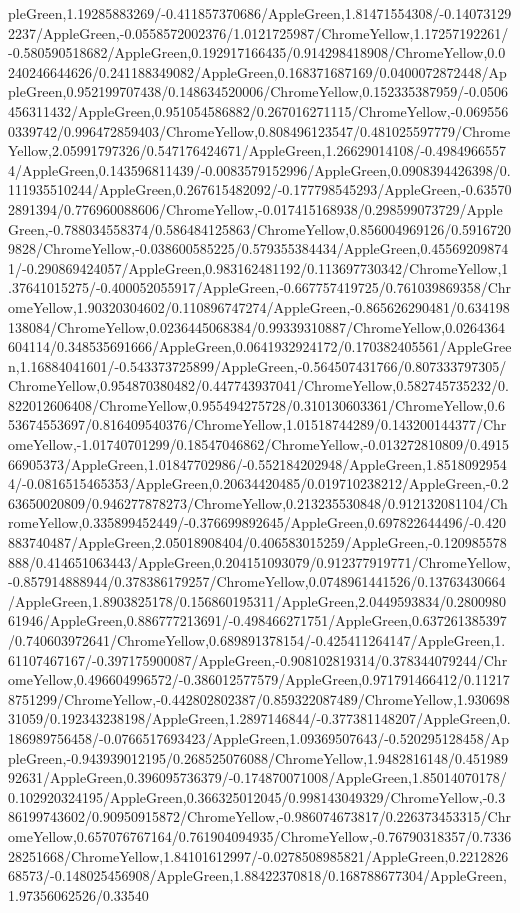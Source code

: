{\begin{tikzternal}
pleGreen,1.19285883269/-0.411857370686/AppleGreen,1.81471554308/-0.140731292237/AppleGreen,-0.0558572002376/1.0121725987/ChromeYellow,1.17257192261/-0.580590518682/AppleGreen,0.192917166435/0.914298418908/ChromeYellow,0.0240246644626/0.241188349082/AppleGreen,0.168371687169/0.0400072872448/AppleGreen,0.952199707438/0.148634520006/ChromeYellow,0.152335387959/-0.0506456311432/AppleGreen,0.951054586882/0.267016271115/ChromeYellow,-0.0695560339742/0.996472859403/ChromeYellow,0.808496123547/0.481025597779/ChromeYellow,2.05991797326/0.547176424671/AppleGreen,1.26629014108/-0.49849665574/AppleGreen,0.143596811439/-0.0083579152996/AppleGreen,0.0908394426398/0.111935510244/AppleGreen,0.267615482092/-0.177798545293/AppleGreen,-0.635702891394/0.776960088606/ChromeYellow,-0.017415168938/0.298599073729/AppleGreen,-0.788034558374/0.586484125863/ChromeYellow,0.856004969126/0.59167209828/ChromeYellow,-0.038600585225/0.579355384434/AppleGreen,0.455692098741/-0.290869424057/AppleGreen,0.983162481192/0.113697730342/ChromeYellow,1.37641015275/-0.400052055917/AppleGreen,-0.667757419725/0.761039869358/ChromeYellow,1.90320304602/0.110896747274/AppleGreen,-0.865626290481/0.634198138084/ChromeYellow,0.0236445068384/0.99339310887/ChromeYellow,0.0264364604114/0.348535691666/AppleGreen,0.0641932924172/0.170382405561/AppleGreen,1.16884041601/-0.543373725899/AppleGreen,-0.564507431766/0.807333797305/ChromeYellow,0.954870380482/0.447743937041/ChromeYellow,0.582745735232/0.822012606408/ChromeYellow,0.955494275728/0.310130603361/ChromeYellow,0.653674553697/0.816409540376/ChromeYellow,1.01518744289/0.143200144377/ChromeYellow,-1.01740701299/0.18547046862/ChromeYellow,-0.013272810809/0.491566905373/AppleGreen,1.01847702986/-0.552184202948/AppleGreen,1.85180929544/-0.0816515465353/AppleGreen,0.20634420485/0.019710238212/AppleGreen,-0.263650020809/0.946277878273/ChromeYellow,0.213235530848/0.912132081104/ChromeYellow,0.335899452449/-0.376699892645/AppleGreen,0.697822644496/-0.420883740487/AppleGreen,2.05018908404/0.406583015259/AppleGreen,-0.120985578888/0.414651063443/AppleGreen,0.204151093079/0.912377919771/ChromeYellow,-0.857914888944/0.378386179257/ChromeYellow,0.0748961441526/0.13763430664/AppleGreen,1.8903825178/0.156860195311/AppleGreen,2.0449593834/0.280098061946/AppleGreen,0.886777213691/-0.498466271751/AppleGreen,0.637261385397/0.740603972641/ChromeYellow,0.689891378154/-0.425411264147/AppleGreen,1.61107467167/-0.397175900087/AppleGreen,-0.908102819314/0.378344079244/ChromeYellow,0.496604996572/-0.386012577579/AppleGreen,0.971791466412/0.112178751299/ChromeYellow,-0.442802802387/0.859322087489/ChromeYellow,1.93069831059/0.192343238198/AppleGreen,1.2897146844/-0.377381148207/AppleGreen,0.186989756458/-0.0766517693423/AppleGreen,1.09369507643/-0.520295128458/AppleGreen,-0.943939012195/0.268525076088/ChromeYellow,1.9482816148/0.45198992631/AppleGreen,0.396095736379/-0.174870071008/AppleGreen,1.85014070178/0.102920324195/AppleGreen,0.366325012045/0.998143049329/ChromeYellow,-0.386199743602/0.90950915872/ChromeYellow,-0.986074673817/0.226373453315/ChromeYellow,0.657076767164/0.761904094935/ChromeYellow,-0.76790318357/0.733628251668/ChromeYellow,1.84101612997/-0.0278508985821/AppleGreen,0.221282668573/-0.148025456908/AppleGreen,1.88422370818/0.168788677304/AppleGreen,1.97356062526/0.33540
\end{tikzternal}}
